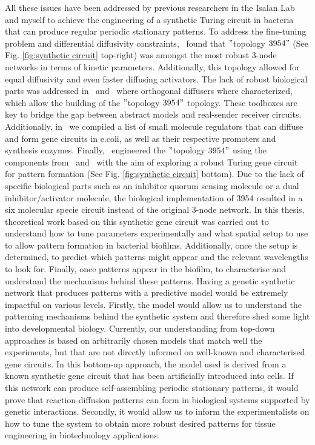 All these issues have been addressed by previous researchers in the Isalan Lab and myself to achieve the engineering of a synthetic Turing circuit in bacteria that can produce regular periodic stationary patterns.
To address the fine-tuning problem and differential diffusivity constraints,~\cite{Scholes2019} found that \("\)topology \(3954"\) (See Fig. \ref{fig:synthetic circuit} top-right) was amongst the most robust 3-node networks in terms of kinetic parameters.
Additionally, this topology allowed for equal diffusivity and even faster diffusing activators.
The lack of robust biological parts was addressed in~\cite{Meyer2019} and~\cite{Du2020} where orthogonal diffusers where characterized, which allow the building of the \("\)topology \(3954"\) topology.
These toolboxes are key to bridge the gap between abstract models and real-sender receiver circuits.
Additionally, in~\cite{huidobro} we compiled a list of small molecule regulators that can diffuse and form gene circuits in e.coli, as well as their respective promoters and synthesis enzymes.
Finally,~\cite{Tica2020} engineered the \("\)topology \(3954"\) using the components from~\cite{Meyer2019} and~\cite{Du2020} with the aim of exploring a robust Turing gene circuit for pattern formation (See Fig. \ref{fig:synthetic circuit} bottom).
Due to the lack of specific biological parts such as an inhibitor quorum sensing molecule or a dual inhibitor/activator molecule, the biological implementation of 3954 resulted in a six molecular specie circuit instead of the original 3-node network.
In this thesis, theoretical work based on this synthetic gene circuit was carried out to understand how to tune parameters experimentally and what spatial setup to use to allow pattern formation in bacterial biofilms.
Additionally, once the setup is determined, to predict which patterns might appear and the relevant wavelengths to look for.
Finally, once patterns appear in the biofilm, to characterise and understand the mechanisms behind these patterns.
Having a genetic synthetic network that produces patterns with a predictive model would be extremely impactful on various levels.
Firstly, the model would allow us to understand the patterning mechanisms behind the synthetic system and therefore shed some light into developmental biology.
Currently, our understanding from top-down approaches is based on arbitrarily chosen models that match well the experiments, but that are not directly informed on well-known and characterised gene circuits.
In this bottom-up approach, the model used is derived from a known synthetic gene circuit that has been artificially introduced into cells. %
If this network can produce self-assembling periodic stationary patterns, it would prove that reaction-diffusion patterns can form in biological systems supported by genetic interactions.
Secondly, it would allow us to inform the experimentalists on how to tune the system to obtain more robust desired patterns for tissue engineering in biotechnology applications.






